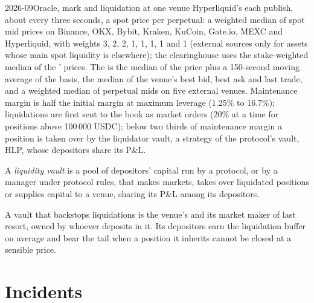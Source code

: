 \begin{dated}{2026-09}{Oracle, mark and liquidation at one venue}\label{dat:m3:on-chain-order-books-and-perpetual-dexs:oracle}
Hyperliquid's  each publish, about every three seconds, a spot  price per perpetual: a weighted median of spot mid
prices on Binance, OKX, Bybit, Kraken, KuCoin, Gate.io, MEXC and Hyperliquid, with weights 3, 2, 2, 1, 1, 1, 1 and 1 (external sources
only for assets whose main spot liquidity is elsewhere); the clearinghouse uses the stake-weighted median of the ' prices.
The  is the median of the  price plus a 150-second moving average of the basis, the median of the venue's best bid,
best ask and last trade, and a weighted median of perpetual mids on five external venues. Maintenance margin is half the initial
margin at maximum leverage (1.25\% to 16.7\%); liquidations are first sent to the book as market orders (20\% at a time for positions
above 100\,000 USDC); below two thirds of maintenance margin a position is taken over by the liquidator vault, a strategy of the
protocol's vault, HLP, whose depositors share its P\&L.
\end{dated}

\begin{definition}\label{def:m3:on-chain-order-books-and-perpetual-dexs:vault}
A \emph{liquidity vault} is a pool of depositors' capital run by a protocol, or by a manager under protocol rules,
that makes markets, takes over liquidated positions or supplies capital to a venue, sharing its P\&L among its depositors.
\end{definition}

A vault that backstops liquidations is the venue's  and its market maker of last resort, owned by whoever deposits in it.
Its depositors earn the liquidation buffer on average and bear the tail when a position it inherits cannot be closed at a sensible price.

\section{Incidents}

